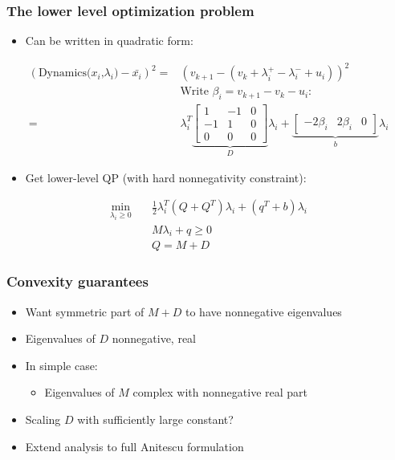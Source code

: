 \documentclass{beamer}
\begin{document}
\begin{frame}
    \frametitle{The lower level optimization problem}

    \begin{itemize}
        \item Can be written in quadratic form:
    \end{itemize}
\begin{align*}
    (\textrm{Dynamics($x_i$,$\lambda_i$)} - \bar{x_i})^2 = &\left(v_{k + 1} - (v_k + \lambda^+_i - \lambda^-_i + u_i)\right)^2 \\
  &\textrm{Write $\beta_i = v_{k+1} - v_k - u_i$: } \\
    = &\lambda_i^T 
        \underbrace{
            \begin{bmatrix} 1 & -1 & 0 \\ -1 & 1 & 0 \\ 0 & 0 & 0 \end{bmatrix} 
        }_D
        \lambda_i + \underbrace{
            \begin{bmatrix} -2 \beta_i & 2 \beta_i & 0 \end{bmatrix}
        }_b  \lambda_i 
\end{align*}
    
    \begin{itemize}
        \item Get lower-level QP (with hard nonnegativity constraint):
    \end{itemize}
    \begin{align*}
        \min _{\lambda_i \geq 0} \quad & \frac{1}{2} \lambda_i^T (Q + Q^T)  \lambda_i + (q^T + b) \lambda_i \\
                                       &M \lambda_i + q \geq 0 \\
                                       & Q = M + D
    \end{align*}
\end{frame}

\begin{frame}
    \frametitle{Convexity guarantees}
    \begin{itemize}
        \item Want symmetric part of $M + D$ to have nonnegative eigenvalues
        \item Eigenvalues of $D$ nonnegative, real
        \item In simple case:
        \begin{itemize}
            \item Eigenvalues of $M$ complex with nonnegative real part
        \end{itemize}
        \item Scaling $D$ with sufficiently large constant?
        \item Extend analysis to full Anitescu formulation
    \end{itemize}
\end{frame}
\end{document}
